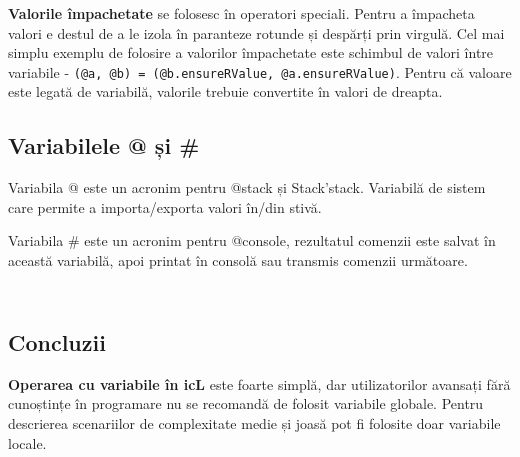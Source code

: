 {\bf Valorile împachetate} se folosesc în operatori speciali. Pentru a împacheta valori e destul de a le izola în paranteze rotunde și despărți prin virgulă. Cel mai simplu exemplu de folosire a valorilor împachetate este schimbul de valori între variabile - \texttt{(@a, @b) = (@b.ensureRValue, @a.ensureRValue)}. Pentru că valoare este legată de variabilă, valorile trebuie convertite în valori de dreapta.

\subsection{Variabilele @ și \#}

{Variabila @} este un acronim pentru @stack și Stack'stack. Variabilă de sistem care permite a importa/exporta valori în/din stivă. 

{Variabila \#} este un acronim pentru @console, rezultatul comenzii este salvat în această variabilă, apoi printat în consolă sau transmis comenzii următoare.


\begin{sourcecode}
    \label{globalvars}
    \inputminted[linenos]{icl}{../sources/globalvars.icL}
\end{sourcecode}

\begin{sourcecode}
    \label{rlvalues}
    \inputminted[linenos]{icl}{../sources/rlvalues.icL}
\end{sourcecode}

\subsection{Concluzii}

{\bf Operarea cu variabile în icL} este foarte simplă, dar utilizatorilor avansați fără cunoștințe în programare nu se recomandă de folosit variabile globale. Pentru descrierea scenariilor de complexitate medie și joasă pot fi folosite doar variabile locale.
